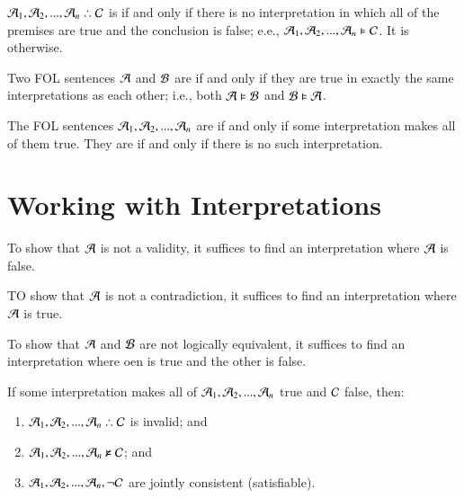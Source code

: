 \begin{definition}
    $\metav{A}_1,\metav{A}_2,...,\metav{A}_n\therefore \metav{C}$ is  if and only if there is no interpretation in which all of the premises are true and the conclusion is false; e.e., $\mathcal{A}_1,\mathcal{A}_2,...,\mathcal{A}_n\vDash\mathcal{C}$. It is  otherwise.
\end{definition}


\begin{definition}
    Two FOL sentences $\mathcal{A}$ and $\mathcal{B}$ are  if and only if they are true in exactly the same interpretations as each other; i.e., both $\mathcal{A}\vDash \mathcal{B}$ and $\mathcal{B}\vDash \mathcal{A}$.
\end{definition}

\begin{definition}
    The FOL sentences $\mathcal{A}_1,\mathcal{A}_2,...,\mathcal{A}_n$ are  if and only if some interpretation makes all of them true. They are  if and only if there is no such interpretation.
\end{definition}

\section{ Working with Interpretations}

\begin{remark}
    To show that $\mathcal{A}$ is not a validity, it suffices to find an interpretation where $\mathcal{A}$ is false.

    TO show that $\mathcal{A}$ is not a contradiction, it suffices to find an interpretation where $\mathcal{A}$ is true.
\end{remark}


\begin{remark}
    To show that $\mathcal{A}$ and $\mathcal{B}$ are not logically equivalent, it suffices to find an interpretation where oen is true and the other is false.
\end{remark}


\begin{remark}
    If some interpretation makes all of $\mathcal{A}_1,\mathcal{A}_2,...,\mathcal{A}_n$ true and $\mathcal{C}$ false, then: \begin{enumerate}
        \item $\metav{A}_1,\metav{A}_2,...,\metav{A}_n\therefore\metav{C}$ is invalid; and
        \item $\mathcal{A}_1,\mathcal{A}_2,...,\mathcal{A}_n\nvDash \mathcal{C}$; and
        \item $\mathcal{A}_1,\mathcal{A}_2,...,\mathcal{A}_n,\neg\mathcal{C}$ are jointly consistent (satisfiable).
    \end{enumerate}
\end{remark}


